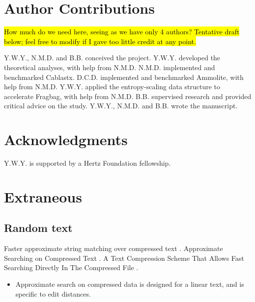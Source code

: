 \documentclass[review,preprint,12pt]{elsarticle}
\renewcommand{\cite}{\citep} %
\theoremstyle{definition}
\theoremstyle{remark}
\numberwithin{equation}{section}
\begin{document}
\section{Author Contributions}
\hl{How much do we need here, seeing as we have only 4 authors? Tentative draft below; feel free to modify if I gave too little credit at any point.}

Y.W.Y., N.M.D. and B.B. conceived the project.
Y.W.Y. developed the theoretical analyses, with help from N.M.D.
N.M.D. implemented and benchmarked Cablastx.
D.C.D. implemented and benchmarked Ammolite, with help from N.M.D.
Y.W.Y. applied the entropy-scaling data structure to accelerate Fragbag, with help from N.M.D.
B.B. supervised research and provided critical advice on the study.
Y.W.Y., N.M.D. and B.B. wrote the manuscript.

\section{Acknowledgments}
Y.W.Y. is supported by a Hertz Foundation fellowship.


%


\newpage

\appendix
\section{Extraneous}
\subsection{Random text}

Faster approximate string matching over compressed text \cite{navarro2001faster}.
Approximate Searching on Compressed Text \cite{perez2005approximate}.
A Text Compression Scheme That Allows Fast Searching Directly In The Compressed File \cite{manber93atext}.
\begin{itemize}
\item Approximate search on compressed data is designed for a linear text, and is specific to edit distances.
\end{itemize}
\end{document}
